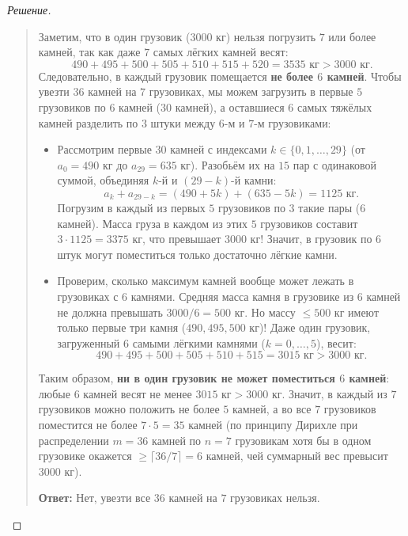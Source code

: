 \begin{proof}[Решение]
\begin{quote}
        Заметим, что в один грузовик ($3000\text{ кг}$) нельзя погрузить $7$ 
        или более камней, так как даже $7$ самых лёгких камней весят:
        \[
            490 + 495 + 500 + 505 + 510 + 515 + 520 = 3535\text{ кг} > 
            3000\text{ кг}.
        \]
        Следовательно, в каждый грузовик помещается \textbf{не более $6$ 
        камней}. Чтобы увезти $36$ камней на $7$ грузовиках, мы можем 
        загрузить в первые $5$ грузовиков по $6$ камней ($30$ камней), а 
        оставшиеся $6$ самых тяжёлых камней разделить по $3$ штуки между 
        $6$-м и $7$-м грузовиками:
        \begin{itemize}
            \item Рассмотрим первые $30$ камней с индексами 
            $k \in \{0, 1, \dots, 29\}$ (от $a_0 = 490\text{ кг}$ до 
            $a_{29} = 635\text{ кг}$). Разобьём их на $15$ пар с одинаковой 
            суммой, объединяя $k$-й и $(29 - k)$-й камни:
            \[
                a_k + a_{29-k} = (490 + 5k) + (635 - 5k) = 1125\text{ кг}.
            \]
            Погрузим в каждый из первых $5$ грузовиков по $3$ такие пары 
            ($6$ камней). Масса груза в каждом из этих $5$ грузовиков 
            составит $3 \cdot 1125 = 3375\text{ кг}$, что превышает 
            $3000\text{ кг}$! Значит, в грузовик по $6$ штук могут 
            поместиться только достаточно лёгкие камни.
            \item Проверим, сколько максимум камней вообще может лежать в 
            грузовиках с $6$ камнями. Средняя масса камня в грузовике из 
            $6$ камней не должна превышать $3000 / 6 = 500\text{ кг}$. Но 
            массу $\le 500\text{ кг}$ имеют только первые три камня 
            ($490, 495, 500\text{ кг}$)! Даже один грузовик, загруженный 
            $6$ самыми лёгкими камнями ($k = 0, \dots, 5$), весит:
            \[
                490 + 495 + 500 + 505 + 510 + 515 = 3015\text{ кг} > 
                3000\text{ кг}.
            \]
        \end{itemize}
        Таким образом, \textbf{ни в один грузовик не может поместиться $6$ 
        камней}: любые $6$ камней весят не менее $3015\text{ кг} > 3000\text{ кг}$. 
        Значит, в каждый из $7$ грузовиков можно положить не более $5$ 
        камней, а во все $7$ грузовиков поместится не более 
        $7 \cdot 5 = 35$ камней (по принципу Дирихле при распределении 
        $m = 36$ камней по $n = 7$ грузовикам хотя бы в одном грузовике 
        окажется $\ge \lceil 36/7 \rceil = 6$ камней, чей суммарный вес 
        превысит $3000\text{ кг}$).

        \textbf{Ответ:} Нет, увезти все $36$ камней на $7$ грузовиках нельзя.
    \end{quote}
\end{proof}

